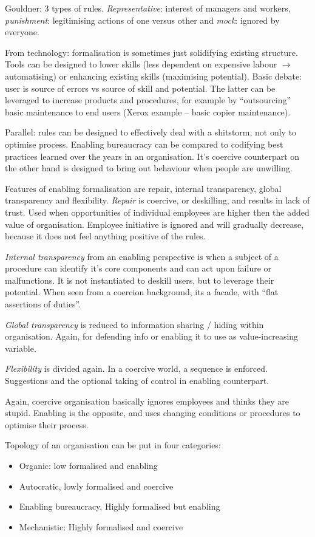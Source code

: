 \documentclass[]{uva-bachelor-thesis}
\begin{document}
Gouldner: 3 types of rules. 
\emph{Representative}: interest of managers and workers, \emph{punishment}: legitimising actions of one versus other and \emph{mock}: ignored by everyone.

From technology: formalisation is sometimes just solidifying existing structure.
Tools can be designed to lower skills (less dependent on expensive labour $\rightarrow$ automatising) or enhancing existing skills (maximising potential).
Basic debate: user is source of errors vs source of skill and potential.
The latter can be leveraged to increase products and procedures, for example by ``outsourcing'' basic maintenance to end users (Xerox example -- basic copier maintenance).

Parallel: rules can be designed to effectively deal with a shitstorm, not only to optimise process. 
Enabling bureaucracy can be compared to codifying best practices learned over the years in an organisation.
It's coercive counterpart on the other hand is designed to bring out behaviour when people are unwilling. 

Features of enabling formalisation are repair, internal transparency, global transparency and flexibility. 
\emph{Repair} is coercive, or deskilling, and results in lack of trust. 
Used when opportunities of individual employees are higher then the added value of organisation. 
Employee initiative is ignored and will gradually decrease, because it does not feel anything positive of the rules. 

\emph{Internal transparency} from an enabling perspective is when a subject of a procedure can identify it's core components and can act upon failure or malfunctions. 
It is not instantiated to deskill users, but to leverage their potential. 
When seen from a coercion background, its a facade, with ``flat assertions of duties''. 

\emph{Global transparency} is reduced to information sharing / hiding within organisation. 
Again, for defending info or enabling it to use as value-increasing variable.

\emph{Flexibility} is divided again. 
In a coercive world, a sequence is enforced. Suggestions and the optional taking of control in enabling counterpart. 

Again, coercive organisation basically ignores employees and thinks they are stupid. 
Enabling is the opposite, and uses changing conditions or procedures to optimise their process. 

Topology of an organisation can be put in four categories:
\begin{itemize}
\item Organic: low formalised and enabling
\item Autocratic, lowly formalised and coercive
\item Enabling bureaucracy, Highly formalised but enabling
\item Mechanistic: Highly formalised and coercive 
\end{itemize}
\end{document}
